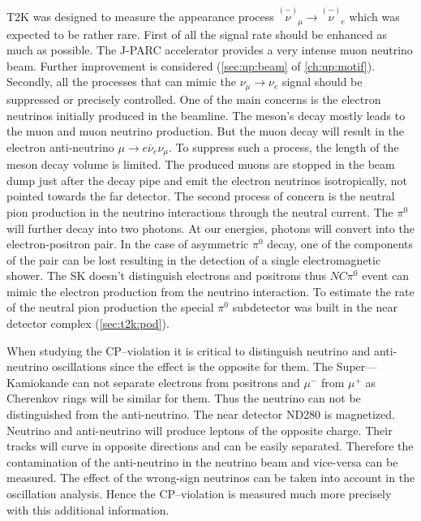 \documentclass[../main.tex]{subfiles}
\begin{document}
T2K was designed to measure the appearance process $\overset{\scriptscriptstyle(-)}{\nu}_\mu\to\overset{\scriptscriptstyle(-)}{\nu}_e$ which was expected to be rather rare. First of all the signal rate should be enhanced as much as possible. The J-PARC accelerator provides a very intense muon neutrino beam. Further improvement is considered (\autoref{sec:up:beam} of \autoref{ch:up:motif}). Secondly, all the processes that can mimic the $\nu_\mu\to\nu_e$ signal should be suppressed or precisely controlled. One of the main concerns is the electron neutrinos initially produced in the beamline. The meson's decay mostly leads to the muon and muon neutrino production. But the muon decay will result in the electron anti-neutrino $\mu\to e\overline{\nu}_e\nu_\mu$. To suppress such a process, the length of the meson decay volume is limited. The produced muons are stopped in the beam dump just after the decay pipe and emit the electron neutrinos isotropically, not pointed towards the far detector. The second process of concern is the neutral pion production in the neutrino interactions through the neutral current. The $\pi^0$ will further decay into two photons. At our energies, photons will convert into the electron-positron pair. In the case of asymmetric $\pi^0$ decay, one of the components of the pair can be lost resulting in the detection of a single electromagnetic shower. The SK doesn't distinguish electrons and positrons thus $NC\pi^0$ event can mimic the electron production from the neutrino interaction. To estimate the rate of the neutral pion production the special $\pi^0$ subdetector was built in the near detector complex (\autoref{sec:t2k:pod}).

When studying the CP--violation it is critical to distinguish neutrino and anti-neutrino oscillations since the effect is the opposite for them. The Super---Kamiokande can not separate electrons from positrons and $\mu^-$ from $\mu^+$ as Cherenkov rings will be similar for them. Thus the neutrino can not be distinguished from the anti-neutrino. The near detector ND280 is magnetized. Neutrino and anti-neutrino will produce leptons of the opposite charge. Their tracks will curve in opposite directions and can be easily separated. Therefore the contamination of the anti-neutrino in the neutrino beam and vice-versa can be measured. The effect of the wrong-sign neutrinos can be taken into account in the oscillation analysis. Hence the CP--violation is measured much more precisely with this additional information.
\end{document}
